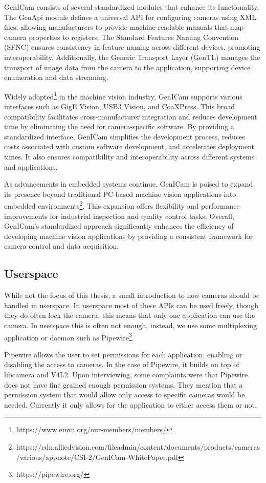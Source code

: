 GenICam consists of several standardized modules that enhance its
functionality. The GenApi module defines a universal API for configuring
cameras using XML files, allowing manufacturers to provide machine-readable
manuals that map camera properties to registers. The Standard Features Naming
Convention (SFNC) ensures consistency in feature naming across different
devices, promoting interoperability. Additionally, the Generic Transport Layer
(GenTL) manages the transport of image data from the camera to the application,
supporting device enumeration and data streaming.

Widely adopted\footnote{https://www.emva.org/our-members/members/} in the
machine vision industry, GenICam supports various interfaces such as GigE
Vision, USB3 Vision, and CoaXPress. This broad compatibility facilitates
cross-manufacturer integration and reduces development time by eliminating the
need for camera-specific software. By providing a standardized interface,
GenICam simplifies the development process, reduces costs associated with
custom software development, and accelerates deployment times. It also ensures
compatibility and interoperability across different systems and applications.

As advancements in embedded systems continue, GenICam is poised to expand its
presence beyond traditional PC-based machine vision applications into embedded
environments\footnote{https://cdn.alliedvision.com/fileadmin/content/documents/products/cameras/various/appnote/CSI-2/GenICam-WhitePaper.pdf}.
This expansion offers flexibility and performance improvements
for industrial inspection and quality control tasks. Overall, GenICam's
standardized approach significantly enhances the efficiency of developing
machine vision applications by providing a consistent framework for camera
control and data acquisition.

\subsection{Userspace}\label{section:userspace}
While not the focus of this thesis, a small introduction to how cameras should
be handled in userspace. In userspace most of these APIs can be used freely,
though they do often lock the camera, this means that only one application can
use the camera. In userspace this is often not enough, instead, we use some
multiplexing application or daemon such as Pipewire\footnote{https://pipewire.org/}.

Pipewire allows the user to set permissions for each application, enabling or
disabling the access to cameras. In the case of Pipewire, it builds on top of
libcamera and V4L2. Upon interviewing, some complaints were that Pipewire does
not have fine grained enough permission systems. They mention that a permission
system that would allow only access to specific cameras would be needed.
Currently it only allows for the application to either access them or not.


